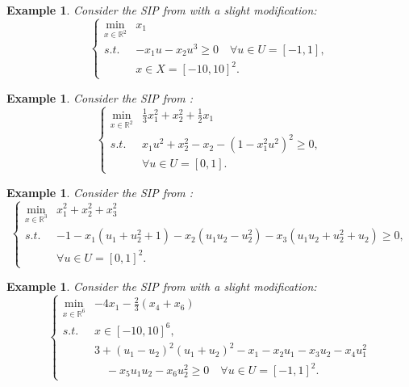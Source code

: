 \documentclass{amsart}
\theoremstyle{plain}
\newtheorem{exmp}[theorem]{Example}
\newcommand{\re}{\mathbb{R}}
\newcommand{\st}{\mathit{s.t.}}
\numberwithin{equation}{section}
\begin{document}
		
		\begin{exmp}\label{ex:yang2016} 
			Consider the SIP from \cite{yang2016optimality} 
			with a slight modification:
			\begin{equation*}
				\left\{
				\begin{array}{lll}
					\min\limits_{x\in \re^2}&x_1 \\
					\st & -x_1u-x_2u^3\geq 0\quad\forall u\in U=[-1,1],\\
					& x\in X=[-10,10]^2.
				\end{array}
				\right.
			\end{equation*}
		\end{exmp}
	
		

		\begin{exmp}\label{Watson2} 
			Consider the SIP from \cite{coope1985projected}:
			\[
			\left\{\begin{array}{cl}
				\min\limits_{x\in\re^2} & \frac{1}{3}x_1^2+x_2^2+\frac{1}{2}x_1\\
				\st & x_1u^2+x_2^2-x_2-(1-x_1^2u^2)^2\ge 0,\\
				& \forall u\in U = [0,1].
			\end{array}
			\right.
			\]
		\end{exmp}
		
		\begin{exmp}\label{Watson7} 
			Consider the SIP from \cite{coope1985projected}:
			\[
			\left\{\begin{array}{cl}
				\min\limits_{x\in\re^3} & x_1^2+x_2^2+x_3^2\\
				\st & -1-x_1(u_1+u_2^2+1)-x_2(u_1u_2-u_2^2)-x_3(u_1u_2+u_2^2+u_2)\ge 0,\\
				& \forall u \in U = [0,1]^2.
			\end{array}
			\right.
			\]
		\end{exmp}
		
		
		\begin{exmp}\label{Watson9} 
			Consider the SIP from \cite{coope1985projected} with a slight modification:
			\[
			\left\{\begin{array}{cl}
				\min\limits_{x\in\re^6} & -4x_1-\frac{2}{3}(x_4+x_6)\\
				\st & x\in [-10,10]^6,\\
				& 3+(u_1-u_2)^2(u_1+u_2)^2-x_1-x_2u_1-x_3u_2-x_4u_1^2\\
				& \quad -x_5u_1u_2-x_6u_2^2\ge 0\quad \forall u\in U = [-1,1]^2.
			\end{array}
			\right.
			\]
		\end{exmp}
\end{document}
